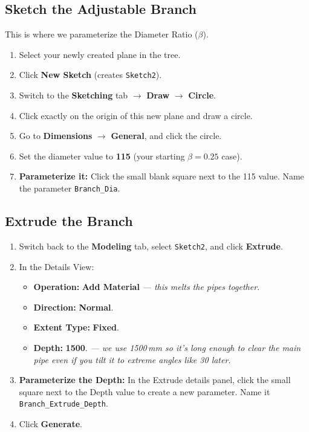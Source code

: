 \documentclass[12pt,a4paper]{report}
\begin{document}
\subsection{Sketch the Adjustable Branch}

This is where we parameterize the Diameter Ratio ($\beta$).

\begin{enumerate}
  \item Select your newly created plane in the tree.
  \item Click \textbf{New Sketch} (creates \texttt{Sketch2}).
  \item Switch to the \textbf{Sketching} tab $\rightarrow$ \textbf{Draw} $\rightarrow$ \textbf{Circle}.
  \item Click exactly on the origin of this new plane and draw a circle.
  \item Go to \textbf{Dimensions} $\rightarrow$ \textbf{General}, and click the circle.
  \item Set the diameter value to \textbf{115} (your starting $\beta = 0.25$ case).
  \item \textbf{Parameterize it:} Click the small blank square next to the 115 value. Name the parameter \texttt{Branch\_Dia}.
\end{enumerate}

\subsection{Extrude the Branch}

\begin{enumerate}
  \item Switch back to the \textbf{Modeling} tab, select \texttt{Sketch2}, and click \textbf{Extrude}.
  \item In the Details View:
  \begin{itemize}
    \item \textbf{Operation:} \textbf{Add Material} \textit{--- this melts the pipes together.}
    \item \textbf{Direction:} \textbf{Normal}.
    \item \textbf{Extent Type:} \textbf{Fixed}.
    \item \textbf{Depth:} \textbf{1500}. \textit{--- we use 1500\,mm so it's long enough to clear the main pipe even if you tilt it to extreme angles like 30\textdegree{} later.}
  \end{itemize}
  \item \textbf{Parameterize the Depth:} In the Extrude details panel, click the small square next to the Depth value to create a new parameter. Name it \texttt{Branch\_Extrude\_Depth}.
  \item Click \textbf{Generate}.
\end{enumerate}
\end{document}
